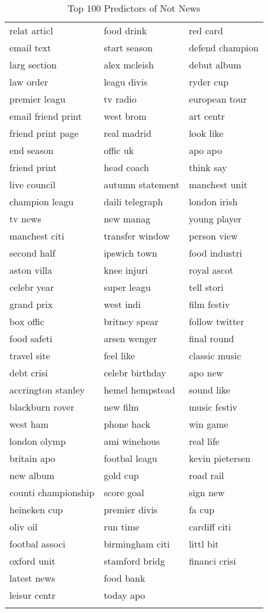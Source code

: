 \begingroup\small
\begin{longtable}{p{}p{}p{}}
\caption{Top 100 Predictors of Not News} \\ 
  \hline
  \hline
relat articl & food drink & red card \\ 
  email text & start season & defend champion \\ 
  larg section & alex mcleish & debut album \\ 
  law order & leagu divis & ryder cup \\ 
  premier leagu & tv radio & european tour \\ 
  email friend print & west brom & art centr \\ 
  friend print page & real madrid & look like \\ 
  end season & offic uk & apo apo \\ 
  friend print & head coach & think say \\ 
  live council & autumn statement & manchest unit \\ 
  champion leagu & daili telegraph & london irish \\ 
  tv news & new manag & young player \\ 
  manchest citi & transfer window & person view \\ 
  second half & ipswich town & food industri \\ 
  aston villa & knee injuri & royal ascot \\ 
  celebr year & super leagu & tell stori \\ 
  grand prix & west indi & film festiv \\ 
  box offic & britney spear & follow twitter \\ 
  food safeti & arsen wenger & final round \\ 
  travel site & feel like & classic music \\ 
  debt crisi & celebr birthday & apo new \\ 
  accrington stanley & hemel hempstead & sound like \\ 
  blackburn rover & new film & music festiv \\ 
  west ham & phone hack & win game \\ 
  london olymp & ami winehous & real life \\ 
  britain apo & footbal leagu & kevin pietersen \\ 
  new album & gold cup & road rail \\ 
  counti championship & score goal & sign new \\ 
  heineken cup & premier divis & fa cup \\ 
  oliv oil & run time & cardiff citi \\ 
  footbal associ & birmingham citi & littl bit \\ 
  oxford unit & stamford bridg & financi crisi \\ 
  latest news & food bank &  \\ 
  leisur centr & today apo &  \\ 
   \hline
\hline
\label{tab:top_100_soft}
\end{longtable}
\endgroup
